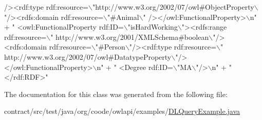 \begin{DoxyCode}
{      /><rdf:type rdf:resource=\(\backslash\)"http://www.w3.org/2002/07/owl#ObjectProperty\(\backslash\)"/><rdfs:domain rdf:resource=\(\backslash\)"#Animal\(\backslash\)"
      /></owl:FunctionalProperty>\(\backslash\)n"}
            + \textcolor{stringliteral}{"  <owl:FunctionalProperty rdf:ID=\(\backslash\)"isHardWorking\(\backslash\)"><rdfs:range rdf:resource=\(\backslash\)"
      http://www.w3.org/2001/XMLSchema#boolean\(\backslash\)"/><rdfs:domain rdf:resource=\(\backslash\)"#Person\(\backslash\)"/><rdf:type rdf:resource=\(\backslash\)"
      http://www.w3.org/2002/07/owl#DatatypeProperty\(\backslash\)"/></owl:FunctionalProperty>\(\backslash\)n"}
            + \textcolor{stringliteral}{"  <Degree rdf:ID=\(\backslash\)"MA\(\backslash\)"/>\(\backslash\)n"} + \textcolor{stringliteral}{"</rdf:RDF>"}
\end{DoxyCode}


The documentation for this class was generated from the following file\-:\begin{DoxyCompactItemize}
\item 
contract/src/test/java/org/coode/owlapi/examples/\hyperlink{_d_l_query_example_8java}{D\-L\-Query\-Example.\-java}\end{DoxyCompactItemize}
